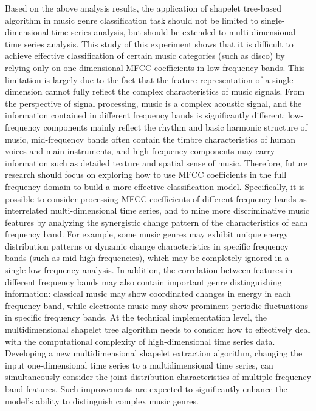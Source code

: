 Based on the above analysis results, the application of shapelet tree-based algorithm in music genre classification task should not be limited to single-dimensional time series analysis, but should be extended to multi-dimensional time series analysis. This study of this experiment shows that it is difficult to achieve effective classification of certain music categories (such as disco) by relying only on one-dimensional MFCC coefficients in low-frequency bands. This limitation is largely due to the fact that the feature representation of a single dimension cannot fully reflect the complex characteristics of music signals. From the perspective of signal processing, music is a complex acoustic signal, and the information contained in different frequency bands is significantly different: low-frequency components mainly reflect the rhythm and basic harmonic structure of music, mid-frequency bands often contain the timbre characteristics of human voices and main instruments, and high-frequency components may carry information such as detailed texture and spatial sense of music. Therefore, future research should focus on exploring how to use MFCC coefficients in the full frequency domain to build a more effective classification model. Specifically, it is possible to consider processing MFCC coefficients of different frequency bands as interrelated multi-dimensional time series, and to mine more discriminative music features by analyzing the synergistic change pattern of the characteristics of each frequency band. For example, some music genres may exhibit unique energy distribution patterns or dynamic change characteristics in specific frequency bands (such as mid-high frequencies), which may be completely ignored in a single low-frequency analysis. In addition, the correlation between features in different frequency bands may also contain important genre distinguishing information: classical music may show coordinated changes in energy in each frequency band, while electronic music may show prominent periodic fluctuations in specific frequency bands. At the technical implementation level, the multidimensional shapelet tree algorithm needs to consider how to effectively deal with the computational complexity of high-dimensional time series data. Developing a new multidimensional shapelet extraction algorithm, changing the input one-dimensional time series to a multidimensional time series, can simultaneously consider the joint distribution characteristics of multiple frequency band features. Such improvements are expected to significantly enhance the model's ability to distinguish complex music genres.